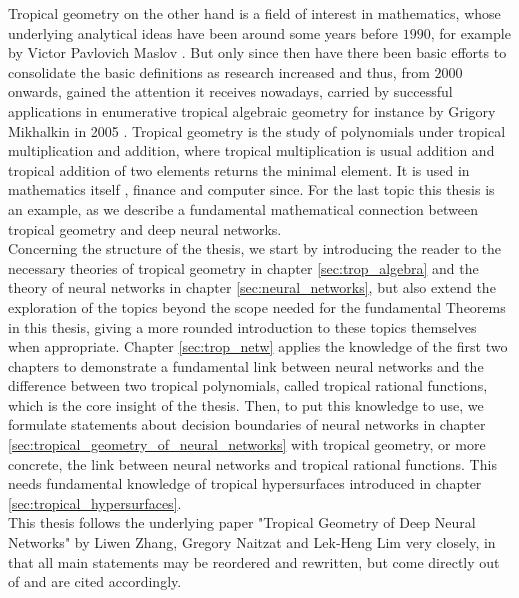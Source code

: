 \documentclass{article}
\theoremstyle{definition}
\begin{document}
Tropical geometry on the other hand is a field of interest in mathematics, whose underlying analytical ideas have been around some years before $1990$, for example by Victor Pavlovich Maslov \cite{maslov1985new}. But only since then have there been basic efforts to consolidate the basic definitions as research increased and thus, from $2000$ onwards, gained the attention it receives nowadays, carried by successful applications in enumerative tropical algebraic geometry for instance by Grigory Mikhalkin in 2005 \cite{mikhalkin2005enumerative}. 
Tropical geometry is the study of polynomials under tropical multiplication and addition, where tropical multiplication is usual addition and tropical addition of two elements returns the minimal element. It is used in mathematics itself \cite{krivulin2014tropical}, finance \cite{klemperer2009new} and computer since. For the last topic this thesis is an example, as we describe a fundamental mathematical connection between tropical geometry and deep neural networks. \\

Concerning the structure of the thesis, we start by introducing the reader to the necessary theories of tropical geometry in chapter \ref{sec:trop_algebra} and the theory of neural networks in chapter \ref{sec:neural_networks}, but also extend the exploration of the topics beyond the scope needed for the fundamental Theorems in this thesis, giving a more rounded introduction to these topics themselves when appropriate. Chapter \ref{sec:trop_netw} applies the knowledge of the first two chapters to demonstrate a fundamental link between neural networks and the difference between two tropical polynomials, called tropical rational functions, which is the core insight of the thesis.
Then, to put this knowledge to use, we formulate statements about decision boundaries of neural networks in chapter \ref{sec:tropical_geometry_of_neural_networks} with tropical geometry, or more concrete, the link between neural networks and tropical rational functions. This needs fundamental 	knowledge of tropical hypersurfaces introduced in chapter \ref{sec:tropical_hypersurfaces}. \\

This thesis follows the underlying paper "Tropical Geometry of Deep Neural Networks" by Liwen Zhang, Gregory Naitzat and Lek-Heng Lim very closely, in that all main statements may be reordered and rewritten, but come directly out of \cite{maclagan2015introduction} and are cited accordingly.

\newpage
\end{document}
